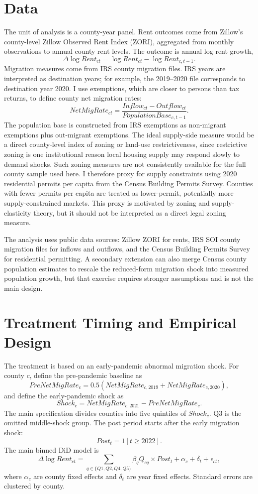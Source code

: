 \documentclass[11pt]{article}
\begin{document}
\section{Data}

The unit of analysis is a county-year panel. Rent outcomes come from Zillow's county-level Zillow Observed Rent Index (ZORI), aggregated from monthly observations to annual county rent levels. The outcome is annual log rent growth,
\[
\Delta \log Rent_{ct}=\log Rent_{ct}-\log Rent_{c,t-1}.
\]
Migration measures come from IRS county migration files. IRS years are interpreted as destination years; for example, the 2019--2020 file corresponds to destination year 2020. I use exemptions, which are closer to persons than tax returns, to define county net migration rates:
\[
NetMigRate_{ct}=\frac{Inflow_{ct}-Outflow_{ct}}{PopulationBase_{c,t-1}}.
\]
The population base is constructed from IRS exemptions as non-migrant exemptions plus out-migrant exemptions. The ideal supply-side measure would be a direct county-level index of zoning or land-use restrictiveness, since restrictive zoning is one institutional reason local housing supply may respond slowly to demand shocks. Such zoning measures are not consistently available for the full county sample used here. I therefore proxy for supply constraints using 2020 residential permits per capita from the Census Building Permits Survey. Counties with fewer permits per capita are treated as lower-permit, potentially more supply-constrained markets. This proxy is motivated by zoning and supply-elasticity theory, but it should not be interpreted as a direct legal zoning measure.

The analysis uses public data sources: Zillow ZORI for rents, IRS SOI county migration files for inflows and outflows, and the Census Building Permits Survey for residential permitting. A secondary extension can also merge Census county population estimates to rescale the reduced-form migration shock into measured population growth, but that exercise requires stronger assumptions and is not the main design.

\section{Treatment Timing and Empirical Design}

The treatment is based on an early-pandemic abnormal migration shock. For county $c$, define the pre-pandemic baseline as
\[
PreNetMigRate_c = 0.5(NetMigRate_{c,2019}+NetMigRate_{c,2020}),
\]
and define the early-pandemic shock as
\[
Shock_c = NetMigRate_{c,2021} - PreNetMigRate_c.
\]
The main specification divides counties into five quintiles of $Shock_c$. Q3 is the omitted middle-shock group. The post period starts after the early migration shock:
\[
Post_t=1[t\geq 2022].
\]
The main binned DiD model is
\[
\Delta \log Rent_{ct}
= \sum_{q\in\{Q1,Q2,Q4,Q5\}}\beta_q Q_{cq}\times Post_t
+\alpha_c+\delta_t+\epsilon_{ct},
\]
where $\alpha_c$ are county fixed effects and $\delta_t$ are year fixed effects. Standard errors are clustered by county.
\end{document}
